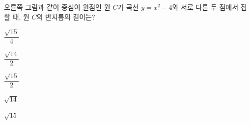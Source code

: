 \noindent\begin{minipage}[t]{0.58\linewidth}\vspace{0pt}\raggedright 오른쪽 그림과 같이 중심이 원점인 원 $C$가 곡선 $y=x^2-4$와 서로 다른 두 점에서 접할 때, 원 $C$의 반지름의 길이는?\end{minipage}\hfill\begin{minipage}[t]{0.4\linewidth}\vspace{0pt}\centering \resizebox{\ifdim\width>\linewidth\linewidth\else\width\fi}{!}{}\end{minipage}\par
\begin{choicesii}{\rule[-3ex]{0pt}{8ex}$\dfrac{\sqrt{15}}{4}$}{\rule[-3ex]{0pt}{8ex}$\dfrac{\sqrt{14}}{2}$}{\rule[-3ex]{0pt}{8ex}$\dfrac{\sqrt{15}}{2}$}{\rule[-3ex]{0pt}{8ex}$\sqrt{14}$}{\rule[-3ex]{0pt}{8ex}$\sqrt{15}$}\end{choicesii}
